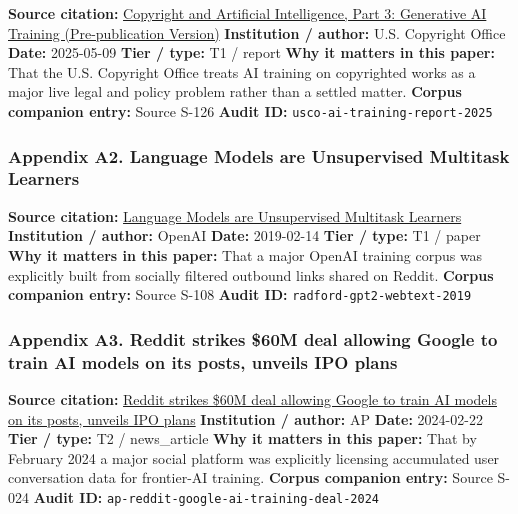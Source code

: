 \documentclass[
  american,
  11pt,
  letterpaper,
]{article}
\begin{document}
\textbf{Source citation:}
\href{https://copyright.gov/ai/Copyright-and-Artificial-Intelligence-Part-3-Generative-AI-Training-Report-Pre-Publication-Version.pdf}{Copyright
and Artificial Intelligence, Part 3: Generative AI Training
(Pre-publication Version)} \textbf{Institution / author:} U.S. Copyright
Office \textbf{Date:} 2025-05-09 \textbf{Tier / type:} T1 / report
\textbf{Why it matters in this paper:} That the U.S. Copyright Office
treats AI training on copyrighted works as a major live legal and policy
problem rather than a settled matter. \textbf{Corpus companion entry:}
Source S-126 \textbf{Audit ID:} \texttt{usco-ai-training-report-2025}

\subsubsection{Appendix A2. Language Models are Unsupervised Multitask
Learners}\label{ch-04-appendix-a2-language-models-are-unsupervised-multitask-learners}

\textbf{Source citation:}
\href{https://cdn.openai.com/better-language-models/language_models_are_unsupervised_multitask_learners.pdf}{Language
Models are Unsupervised Multitask Learners} \textbf{Institution /
author:} OpenAI \textbf{Date:} 2019-02-14 \textbf{Tier / type:} T1 /
paper \textbf{Why it matters in this paper:} That a major OpenAI
training corpus was explicitly built from socially filtered outbound
links shared on Reddit. \textbf{Corpus companion entry:} Source S-108
\textbf{Audit ID:} \texttt{radford-gpt2-webtext-2019}

\subsubsection{Appendix A3. Reddit strikes \$60M deal allowing Google to
train AI models on its posts, unveils IPO
plans}\label{ch-04-appendix-a3-reddit-strikes-60m-deal-allowing-google-to-train-ai-models-on-its-posts-unveils-ipo-plans}

\textbf{Source citation:}
\href{https://apnews.com/article/a7f131c7cb4225307134ef21d3c6a708}{Reddit
strikes \$60M deal allowing Google to train AI models on its posts,
unveils IPO plans} \textbf{Institution / author:} AP \textbf{Date:}
2024-02-22 \textbf{Tier / type:} T2 / news\_article \textbf{Why it
matters in this paper:} That by February 2024 a major social platform
was explicitly licensing accumulated user conversation data for
frontier-AI training. \textbf{Corpus companion entry:} Source S-024
\textbf{Audit ID:} \texttt{ap-reddit-google-ai-training-deal-2024}
\end{document}
